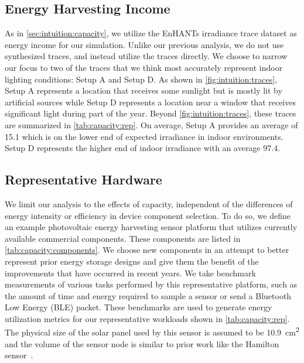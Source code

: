 \subsection{Energy Harvesting Income}
As in \cref{sec:intuition:capacity}, we utilize the EnHANTs irradiance trace dataset as energy income for our simulation.
Unlike our previous analysis, we do not use synthesized traces, and instead utilize the traces directly.
We choose to narrow our focus to two of the traces that we think most accurately represent indoor lighting conditions: Setup A and Setup D.
As shown in \cref{fig:intuition:traces}, Setup A represents a location that receives some sunlight but is mostly lit by artificial sources while Setup D represents a location near a window that receives significant light during part of the year.
Beyond \cref{fig:intuition:traces}, these traces are summarized in \cref{tab:capacity:rep}.
On average, Setup A provides an average of 15.1\ssi[per-mode=symbol]{\micro\watt\per\centi\meter\squared} which is on the lower end of expected irradiance in indoor environments. Setup D represents the higher end of indoor irradiance with an average 97.4\ssi[per-mode=symbol]{\micro\watt\per\centi\meter\squared}.


\subsection{Representative Hardware}
We limit our analysis to the effects of capacity,
independent of the differences of energy intensity or efficiency in device
component selection. To do so, we define an example photovoltaic energy harvesting
sensor platform that utilizes currently available commercial
components. These components are listed in \cref{tab:capacity:components}.
We choose new
components in an attempt to better represent prior energy storage designs and
give them the benefit of the improvements that have occurred in recent years.
We take benchmark
measurements of various tasks performed by this representative platform, such as the
amount of time and energy required to sample a sensor or send a Bluetooth Low
Energy (BLE) packet. 
These benchmarks are used to generate energy utilization metrics
for our representative workloads shown in \cref{tab:capacity:rep}.
The physical size of the solar panel used by this sensor
is assumed to be
10.9~cm\textsuperscript{2} and the volume of the sensor node is similar to prior
work like the Hamilton sensor~\cite{kim2018system}.

